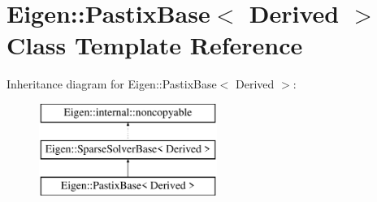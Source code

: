 \hypertarget{class_eigen_1_1_pastix_base}{}\section{Eigen\+::Pastix\+Base$<$ Derived $>$ Class Template Reference}
\label{class_eigen_1_1_pastix_base}
Inheritance diagram for Eigen\+::Pastix\+Base$<$ Derived $>$\+:\begin{figure}[H]
\begin{center}
\leavevmode
\includegraphics[height=3.000000cm]{class_eigen_1_1_pastix_base}
\end{center}
\end{figure}
